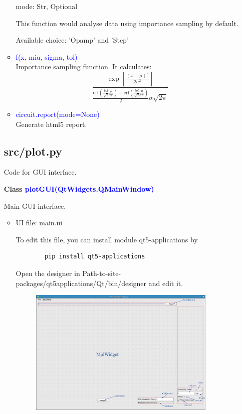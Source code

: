\documentclass[12pt,a4paper]{article}
\begin{document}
\begin{itemize}[leftmargin=*]
\begin{itemize}
        mode: Str, Optional\par
        \quad This function would analyse data using importance sampling by default.

        \quad Available choice: 'Opamp' and 'Step'

    \item \textcolor{blue}{f(x, miu, sigma, tol)}\\
        Importance sampling function. It calculates:
        \begin{equation*}
            \frac{\exp\left [\frac{(x-\mu)^2}{2\sigma^2}\right ]}{\frac{\text{erf}(\frac{tol\cdot\mu}{\sqrt{2}\sigma\pi})-\text{erf}(\frac{tol\cdot\mu}{\sqrt{2}\sigma\pi})}{2}\sigma\sqrt{2\pi}}
        \end{equation*}

    \item \textcolor{blue}{circuit.report(mode=None)}\\
        Generate html5 report.
\end{itemize}

\subsection{src/plot.py}
Code for GUI interface.

\textbf{Class \textcolor{blue}{plotGUI(QtWidgets.QMainWindow)}}

Main GUI interface.

\begin{itemize}
    \item UI file: main.ui\par
        To edit this file, you can install module qt5-applications by
        \begin{lstlisting}
        pip install qt5-applications
        \end{lstlisting}

        Open the designer in Path-to-site-packages/qt5\textunderscore applications/Qt/bin/designer and edit it.
        \begin{figure}[ht]
            \centering
            \includegraphics[width=0.9\textwidth]{Image/main.eps}
            \caption{}
        \end{figure}



\end{itemize}
\end{itemize}
\end{document}
